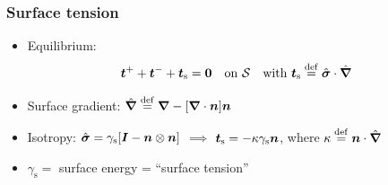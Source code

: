 \documentclass[11pt]{beamer} %
\newcommand{\surf}{\mathrm{s}}
\begin{document}
\begin{frame}
 \frametitle{Surface tension}
\color{gray}
    \begin{center}
    
    \end{center}
\begin{itemize}
\color{gray}
 \item Equilibrium:
 \vspace{-2em}
\begin{align*}
    \ta{t}^+ + \ta{t}^- + \ta{t}_\surf &= \ta{0} \quad \text{on} \,\, \mathcal{S} \quad \text{with } \ta{t}_\surf \defeq \hat{\ts\sigma}\cdot\hat{\diff}
\end{align*}
\item Surface gradient: $\hat{\boldsymbol{\nabla}} \overset{\mathrm{def}}{=} \boldsymbol{\nabla} - [\boldsymbol{\nabla}\cdot\boldsymbol{n}]\boldsymbol{n}$
\color{black}
\item Isotropy: $\hat{\ts\sigma} = \gamma_\surf[\ts I-\ta n\outerp\ts n]$ $\implies$
$ \ta t_\surf = -\kappa \gamma_\surf \ta n$, where $\kappa \overset{\mathrm{def}}{=} \boldsymbol{n} \cdot\hat{\boldsymbol{\nabla}}$
\item $\gamma_\surf = $ surface energy = ``surface tension''
\end{itemize}
\end{frame}
\end{document}
